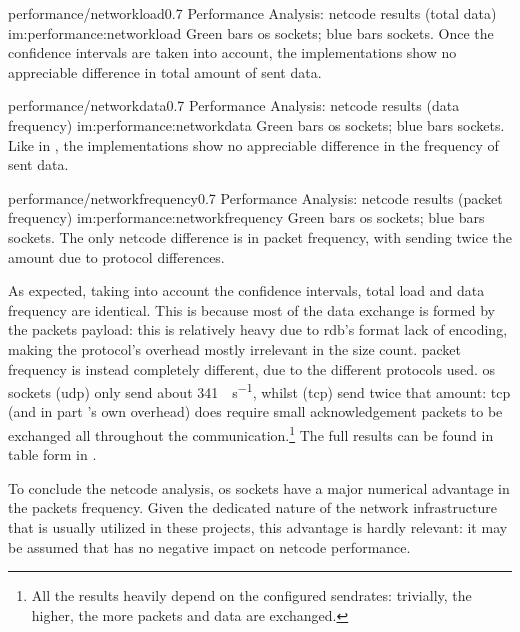 \begin{image}
	{performance/networkload}{0.7}
	{Performance Analysis: \gls{netcode} results (total data)}
	{im:performance:networkload}
	{}
	{Green bars \gls{os} sockets; blue bars  sockets. Once the confidence intervals are taken into account, the implementations show no appreciable difference in total amount of sent data.}
\end{image}

\begin{image}
	{performance/networkdata}{0.7}
	{Performance Analysis: \gls{netcode} results (data frequency)}
	{im:performance:networkdata}
	{}
	{Green bars \gls{os} sockets; blue bars  sockets. Like in , the implementations show no appreciable difference in the frequency of sent data.}
\end{image}

\begin{image}
	{performance/networkfrequency}{0.7}
	{Performance Analysis: \gls{netcode} results (\gls{packet} frequency)}
	{im:performance:networkfrequency}
	{}
	{Green bars \gls{os} sockets; blue bars  sockets. The only \gls{netcode} difference is in \gls{packet} frequency, with  sending twice the amount due to protocol differences.}
\end{image}

As expected, taking into account the confidence intervals, total load and data frequency are identical. This is because most of the data exchange is formed by the \glspl{packet} \gls{payload}: this is relatively heavy due to \gls{rdb}'s format lack of encoding, making the protocol's overhead mostly irrelevant in the size count. \Gls{packet} frequency is instead completely different, due to the different protocols used. \gls{os} sockets (\gls{udp}) only send about \SI{341}{\packets\per\second}, whilst  (\gls{tcp}) send twice that amount: \gls{tcp} (and in part 's own overhead) does require small acknowledgement \glspl{packet} to be exchanged all throughout the communication.\footnote{All the results heavily depend on the configured \glspl{sendrate}: trivially, the higher, the more \glspl{packet} and data are exchanged.} The full results can be found in table form in .

To conclude the \gls{netcode} analysis, \gls{os} sockets have a major numerical advantage in the \glspl{packet} frequency. Given the dedicated nature of the network infrastructure that is usually utilized in these projects, this advantage is hardly relevant: it may be assumed that  has no negative impact on \gls{netcode} performance.

